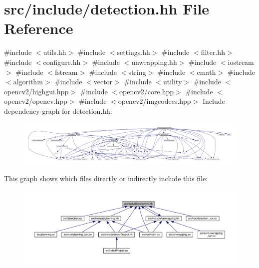 \hypertarget{detection_8hh}{}\section{src/include/detection.hh File Reference}
\label{detection_8hh}
{\ttfamily \#include $<$utils.\+hh$>$}\newline
{\ttfamily \#include $<$settings.\+hh$>$}\newline
{\ttfamily \#include $<$filter.\+hh$>$}\newline
{\ttfamily \#include $<$configure.\+hh$>$}\newline
{\ttfamily \#include $<$unwrapping.\+hh$>$}\newline
{\ttfamily \#include $<$iostream$>$}\newline
{\ttfamily \#include $<$fstream$>$}\newline
{\ttfamily \#include $<$string$>$}\newline
{\ttfamily \#include $<$cmath$>$}\newline
{\ttfamily \#include $<$algorithm$>$}\newline
{\ttfamily \#include $<$vector$>$}\newline
{\ttfamily \#include $<$utility$>$}\newline
{\ttfamily \#include $<$opencv2/highgui.\+hpp$>$}\newline
{\ttfamily \#include $<$opencv2/core.\+hpp$>$}\newline
{\ttfamily \#include $<$opencv2/opencv.\+hpp$>$}\newline
{\ttfamily \#include $<$opencv2/imgcodecs.\+hpp$>$}\newline
Include dependency graph for detection.\+hh\+:
\nopagebreak
\begin{figure}[H]
\begin{center}
\leavevmode
\includegraphics[width=350pt]{detection_8hh__incl}
\end{center}
\end{figure}
This graph shows which files directly or indirectly include this file\+:
\nopagebreak
\begin{figure}[H]
\begin{center}
\leavevmode
\includegraphics[width=350pt]{detection_8hh__dep__incl}
\end{center}
\end{figure}
